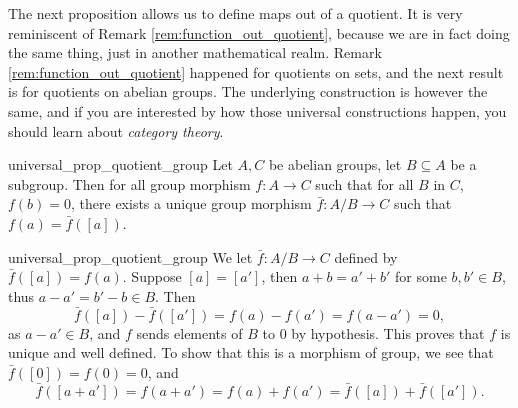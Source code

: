 The next proposition allows us to define maps out of a quotient. It is very reminiscent of Remark \ref{rem:function_out_quotient}, because we are in fact doing the same thing, just in another mathematical realm. Remark \ref{rem:function_out_quotient} happened for quotients on sets, and the next result is for quotients on abelian groups. The underlying construction is however the same, and if you are interested by how those universal constructions happen, you should learn about \textit{category theory}.

\begin{cprop}{}{universal_prop_quotient_group}
    Let \( A, C \) be abelian groups, let \( B \subseteq A \) be a subgroup. Then for all group morphism \( f : A \to C \) such that for all \( B \) in \( C \), \( f(b) = 0 \), there exists a unique group morphism \( \bar f : A / B \to C \) such that \( f(a) = \bar f([a]) \). 
\end{cprop}
\begin{propproof}{universal_prop_quotient_group}
    We let \( \bar f : A / B \to C \) defined by \( \bar f ([a]) = f(a) \). Suppose \( [a] = [a'] \), then \( a + b = a' + b' \) for some \( b, b' \in B \), thus \( a - a' = b' - b \in B \). Then
    \begin{equation*}
        \bar f ([a]) - \bar f ([a']) = f(a) - f(a') = f(a - a') = 0,
    \end{equation*}
    as \( a - a' \in B \), and \( f \) sends elements of \( B \) to \( 0 \) by hypothesis. This proves that \( f \) is unique and well defined. To show that this is a morphism of group, we see that \( \bar f([0]) = f(0) = 0 \), and
    \begin{equation*}
        \bar f([a + a']) = f(a + a') = f(a) + f(a') = \bar f([a]) + \bar f([a']). 
    \end{equation*}
\end{propproof}

